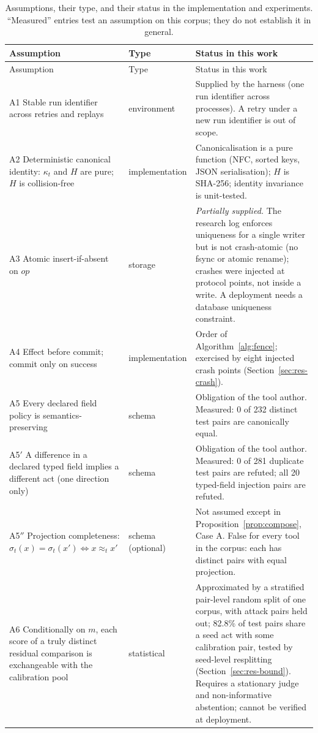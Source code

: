 {\footnotesize
\begin{longtable}{@{}p{3.1cm}p{2.4cm}p{7.6cm}@{}}
\caption{Assumptions, their type, and their status in the implementation and experiments. ``Measured'' entries test an assumption on this corpus; they do not establish it in general.}\label{tab:assumptions}\\
\toprule
Assumption & Type & Status in this work \\
\midrule
\endfirsthead
\toprule
Assumption & Type & Status in this work \\
\midrule
\endhead
A1 Stable run identifier across retries and replays & environment & Supplied by the harness (one run identifier across processes). A retry under a new run identifier is out of scope. \\
A2 Deterministic canonical identity: $\kappa_t$ and $H$ are pure; $H$ is collision-free & implementation & Canonicalisation is a pure function (NFC, sorted keys, JSON serialisation); $H$ is SHA-256; identity invariance is unit-tested. \\
A3 Atomic insert-if-absent on $\mathit{op}$ & storage & \emph{Partially supplied.} The research log enforces uniqueness for a single writer but is not crash-atomic (no fsync or atomic rename); crashes were injected at protocol points, not inside a write. A deployment needs a database uniqueness constraint. \\
A4 Effect before commit; commit only on success & implementation & Order of Algorithm~\ref{alg:fence}; exercised by eight injected crash points (Section~\ref{sec:res-crash}). \\
A5 Every declared field policy is semantics-preserving & schema & Obligation of the tool author. Measured: 0 of 232 distinct test pairs are canonically equal. \\
A5$'$ A difference in a declared typed field implies a different act (one direction only) & schema & Obligation of the tool author. Measured: 0 of 281 duplicate test pairs are refuted; all 20 typed-field injection pairs are refuted. \\
A5$''$ Projection completeness: $\sigma_t(x)=\sigma_t(x')\Leftrightarrow x\approx_t x'$ & schema (optional) & Not assumed except in Proposition~\ref{prop:compose}, Case A. False for every tool in the corpus: each has distinct pairs with equal projection. \\
A6 Conditionally on $m$, each score of a truly distinct residual comparison is exchangeable with the calibration pool & statistical & Approximated by a stratified pair-level random split of one corpus, with attack pairs held out; 82.8\% of test pairs share a seed act with some calibration pair, tested by seed-level resplitting (Section~\ref{sec:res-bound}). Requires a stationary judge and non-informative abstention; cannot be verified at deployment. \\

\end{longtable}}
